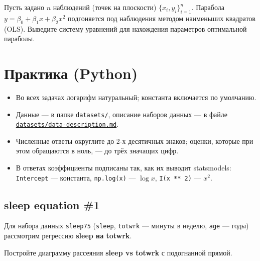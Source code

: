 \documentclass[
  russian,
]{article}
\providecommand{\tightlist}{%
  \setlength{\itemsep}{0pt}\setlength{\parskip}{0pt}}
\begin{document}
Пусть задано \(n\) наблюдений (точек на плоскости)
\(\lbrace x_i,y_i\rbrace_{i=1}^n\). Парабола
\(y=\beta_0+\beta_1x+\beta_2x^2\) подгоняется под наблюдения методом
наименьших квадратов (OLS). Выведите систему уравнений для нахождения
параметров оптимальной параболы.

\section{Практика
(Python)}\label{ux43fux440ux430ux43aux442ux438ux43aux430-python}

\begin{tcolorbox}[enhanced jigsaw, arc=.35mm, bottomrule=.15mm, bottomtitle=1mm, breakable, colback=white, colbacktitle=quarto-callout-important-color!10!white, colframe=quarto-callout-important-color-frame, coltitle=black, left=2mm, leftrule=.75mm, opacityback=0, opacitybacktitle=0.6, rightrule=.15mm, title=\textcolor{quarto-callout-important-color}{\faExclamation}\hspace{0.5em}{Важно}, titlerule=0mm, toprule=.15mm, toptitle=1mm]

\begin{itemize}
\tightlist
\item
  Во всех задачах логарифм натуральный; константа включается по
  умолчанию.
\item
  Данные --- в папке \texttt{datasets/}, описание наборов данных --- в
  файле
  \href{../datasets/data-description.md}{\texttt{datasets/data-description.md}}.
\item
  Численные ответы округлите до 2-х десятичных знаков; оценки, которые
  при этом обращаются в ноль, --- до трёх значащих цифр.
\item
  В ответах коэффициенты подписаны так, как их выводит statsmodels:
  \texttt{Intercept} --- константа, \texttt{np.log(x)} --- \(\log x\),
  \texttt{I(x\ **\ 2)} --- \(x^2\).
\end{itemize}

\end{tcolorbox}

\subsection{sleep equation \#1}\label{sleep-equation-1}

Для набора данных \texttt{sleep75} (\texttt{sleep}, \texttt{totwrk} ---
минуты в неделю, \texttt{age} --- годы) рассмотрим регрессию
\textbf{sleep на totwrk}.

Постройте диаграмму рассеяния \textbf{sleep vs totwrk} с подогнанной
прямой.
\end{document}
